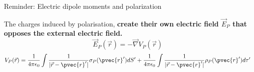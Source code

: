 {\begin{frame}{Reminder: Electric dipole moments and polarization}
\vspace{0.1cm}

The charges induced by polarisation,
{\bf create their own electric field $\vec{E}_{P}$ that opposes the external electric field.}
\begin{equation*}
  \vec{E}_{P}(\vec{r}) = - \vec{\nabla} V_{P}(\vec{r})
\end{equation*}
\begin{equation*}
  V_{P}(\vec{r}) =
    \frac{1}{4\pi \epsilon_0} \int \frac{1}{|\vec{r} - \pvec{r}'|} \sigma_{P} (\pvec{r}') dS^{\prime} +
    \frac{1}{4\pi \epsilon_0} \int \frac{1}{|\vec{r} - \pvec{r}'|} \rho_{P}   (\pvec{r}') d\tau^{\prime}
\end{equation*}

\end{frame}

} %

%
%
%

